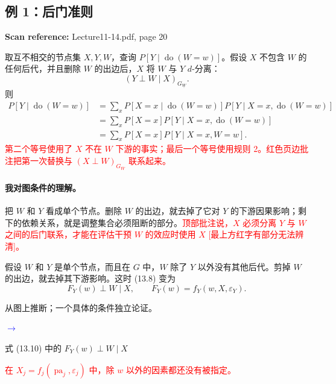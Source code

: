 \documentclass[11pt,a4paper]{article}
\newcommand{\sourcepages}[1]{\par{\small\sffamily\color{muted}\textbf{Scan reference:} #1\par}\nobreak\smallskip\nopagebreak[4]}
\newcommand{\inkred}[1]{\textcolor{red}{#1}}
\newcommand{\notearrow}[3]{%
\par\Needspace{6\baselineskip}\smallskip
\noindent\begin{minipage}[c]{0.43\linewidth}\raggedright\color{#1}#2\end{minipage}%
\hfill\textcolor{#1}{\(\longrightarrow\)}\hfill%
\begin{minipage}[c]{0.43\linewidth}\raggedright#3\end{minipage}\par\smallskip}
\begin{document}
\subsection{例 1：后门准则}
\sourcepages{Lecture11-14.pdf, page 20}
取互不相交的节点集 $X,Y,W$，查询 $P[Y\mid\operatorname{do}(W=w)]$。假设 $X$ 不包含 $W$ 的任何后代，并且删除 $W$ 的出边后，$X$ 将 $W$ 与 $Y$ $d$-分离：
\[
 (Y\perp W\mid X)_{G_{\underline W}}.\tag{13.8}
\]
则
\begin{align*}
 P[Y\mid\operatorname{do}(W=w)]
 &=\sum_xP[X=x\mid\operatorname{do}(W=w)]
 P[Y\mid X=x,\operatorname{do}(W=w)]\\
 &=\sum_xP[X=x]P[Y\mid X=x,\operatorname{do}(W=w)]\\
 &=\sum_xP[X=x]P[Y\mid X=x,W=w].\tag{13.9}
\end{align*}
\inkred{第二个等号使用了 $X$ 不在 $W$ 下游的事实；最后一个等号使用规则 2。红色页边批注把第一次替换与 $(X\perp W)_{G_{\overline W}}$ 联系起来。}

\paragraph{我对图条件的理解。}
把 $W$ 和 $Y$ 看成单个节点。删除 $W$ 的出边，就去掉了它对 $Y$ 的下游因果影响；剩下的依赖关系，就是调整集合必须阻断的部分。\inkred{顶部批注说，$X$ 必须分离 $Y$ 与 $W$ 之间的后门联系，才能在评估干预 $W$ 的效应时使用 $X$ [最上方红字有部分无法辨清]。}

假设 $W$ 和 $Y$ 是单个节点，而且在 $G$ 中，$W$ 除了 $Y$ 以外没有其他后代。剪掉 $W$ 的出边，就去掉其下游影响。这时 (13.8) 变为
\[
 F_Y(w)\perp W\mid X,\qquad
 F_Y(w)=f_Y(w,X,\varepsilon_Y).\tag{13.10}
\]
\notearrow{blue}{从图上推断；一个具体的条件独立论证。}{式 (13.10) 中的 $F_Y(w)\perp W\mid X$}
\inkred{在 $X_j=f_j(\operatorname{pa}_j,\varepsilon_j)$ 中，除 $w$ 以外的因素都还没有被指定。}

\end{document}
